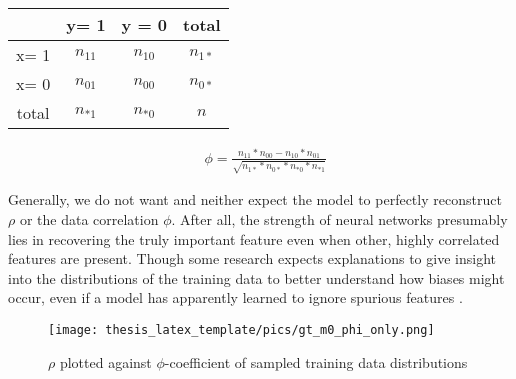 \vspace{1em}
\begin{minipage}[t]{0.45\textwidth}
\begin{tabular}{|c|c|c|c|}
    \hline
     & y= 1 & y = 0 & total  \\  \hline
    x= 1 & $n_{11}$ & $n_{10}$ & $n_{1*}$ \\ \hline
    x= 0 & $n_{01}$ & $n_{00}$ & $n_{0*}$ \\ \hline
    total& $n_{*1}$ & $n_{*0}$ & $n$ \\ \hline
\end{tabular}
\end{minipage}%
\begin{minipage}[c]{0.45\textwidth}
\begin{align}
& \phi = \frac{n_{11} * n_{00} - n_{10}*n_{01}}{\sqrt{n_{1*}*n_{0*}*n_{*0}*n_{*1}}}
\end{align}
\end{minipage}
\vspace{1em}

Generally, we do not want and neither expect the model to perfectly reconstruct $\rho$ or the data correlation $\phi$. After all, the strength of neural networks presumably lies in recovering the truly important feature even when other, highly correlated features are present. Though some research expects explanations to give insight into the distributions of the training data to better understand how biases might occur, even if a model has apparently learned to ignore spurious features \cite{Kindermans2017}. 

\begin{figure}
    \centering
    \texttt{[image: thesis\_latex\_template/pics/gt\_m0\_phi\_only.png]}
    \caption[Choosing measure for $m_0$]{$\rho$ plotted against $\phi$-coefficient of sampled training data distributions }
    \label{fig:finding_rho}
\end{figure}

